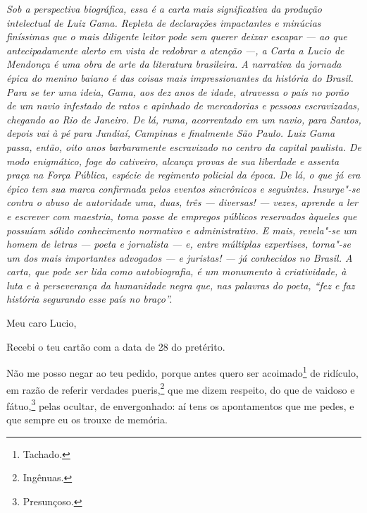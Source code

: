 \begin{flushleft}
{\footnotesize\itshape
Sob a perspectiva biográfica, essa é a carta mais significativa da
produção intelectual de Luiz Gama. Repleta de declarações impactantes e
minúcias finíssimas que o mais diligente leitor pode sem querer deixar
escapar --- ao que antecipadamente alerto em vista de redobrar a atenção
---, a Carta a Lucio de Mendonça é uma obra de arte da literatura
brasileira. A narrativa da jornada épica do menino baiano é das coisas
mais impressionantes da história do Brasil. Para se ter uma ideia, Gama,
aos dez anos de idade, atravessa o país no porão de um navio infestado
de ratos e apinhado de mercadorias e pessoas escravizadas, chegando ao
Rio de Janeiro. De lá, ruma, acorrentado em um navio, para Santos,
depois vai à pé para Jundiaí, Campinas e finalmente São Paulo. Luiz Gama
passa, então, oito anos barbaramente escravizado no centro da capital
paulista. De modo enigmático, foge do cativeiro, alcança provas de sua
liberdade e assenta praça na Força Pública, espécie de regimento
policial da época. De lá, o que já era épico tem sua marca confirmada
pelos eventos sincrônicos e seguintes. Insurge"-se contra o abuso de
autoridade uma, duas, três --- diversas! --- vezes, aprende a ler e
escrever com maestria, toma posse de empregos públicos reservados
àqueles que possuíam sólido conhecimento normativo e administrativo. E
mais, revela"-se um homem de letras --- poeta e jornalista --- e, entre
múltiplas expertises, torna"-se um dos mais importantes advogados --- e
juristas! --- já conhecidos no Brasil. A carta, que pode ser lida como
autobiografia, é um monumento à criatividade, à luta e à perseverança da
humanidade negra que, nas palavras do poeta, ``fez e faz história
segurando esse país no braço''. }
\end{flushleft}

\pagebreak


\noindent{}Meu caro Lucio,\smallskip

Recebi o teu cartão com a data de 28 do pretérito.

Não me posso negar ao teu pedido, porque antes quero ser
acoimado\footnote{Tachado.} de ridículo, em razão de referir verdades
pueris,\footnote{Ingênuas.} que me dizem respeito, do que de vaidoso e
fátuo,\footnote{Presunçoso.} pelas ocultar, de envergonhado: aí tens
os apontamentos que me pedes, e que sempre eu os trouxe de memória.

